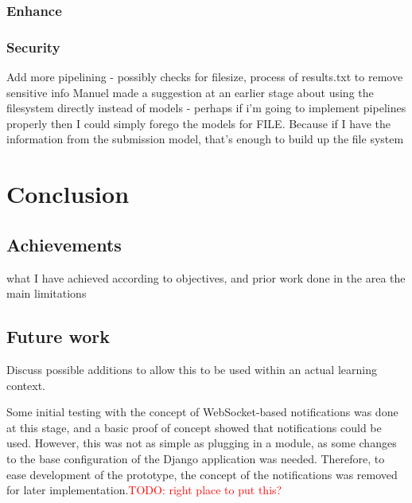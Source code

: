 \documentclass[a4paper,11pt]{report}
\newcommand{\todo}[1]{\textcolor{red}{TODO: #1}}
\begin{document}
\subsection{Enhance}
\subsection{Security}

Add more pipelining - possibly checks for filesize, process of results.txt to remove sensitive info Manuel made a suggestion at an earlier stage about using the filesystem directly instead of models - perhaps if i'm going to implement pipelines properly then I could simply forego the models for FILE. Because if I have the information from the submission model, that's enough to build up the file system\par


\chapter{Conclusion}
\section{Achievements}
what I have achieved according to objectives, and prior work done in the area
the main limitations
\section{Future work}
Discuss possible additions to allow this to be used within an actual learning context.\par
Some initial testing with the concept of WebSocket-based notifications was done at this stage, and a basic proof of concept showed that notifications could be used. However, this was not as simple as plugging in a module, as some changes to the base configuration of the Django application was needed. Therefore, to ease development of the prototype, the concept of the notifications was removed for later implementation.\todo{right place to put this?}\par




\pagebreak
\singlespacing
\printbibliography
{}

\end{document}
